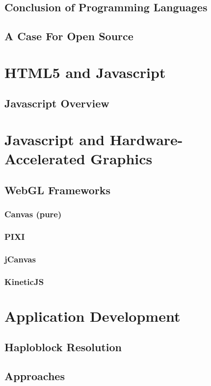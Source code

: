 \subsection{Conclusion of Programming Languages}
\subsection{A Case For Open Source}


\section{HTML5 and Javascript}
\subsection{Javascript Overview}

\section{Javascript and Hardware-Accelerated Graphics}
\subsection{WebGL Frameworks}
\subsubsection{Canvas (pure)}
\subsubsection{PIXI}
\subsubsection{jCanvas}
\subsubsection{KineticJS}

\section{Application Development}
\subsection{Haploblock Resolution}
\subsection{Approaches}

